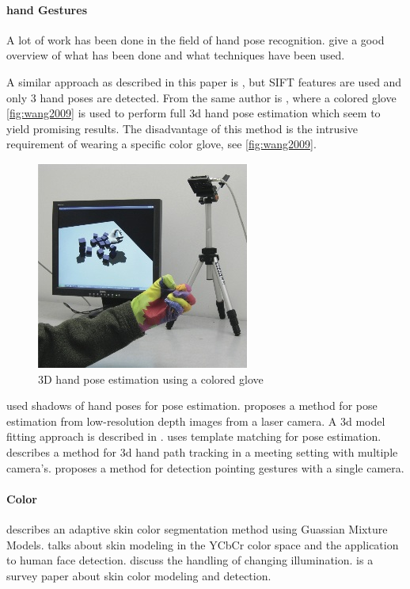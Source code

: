 \paragraph{hand Gestures}
A lot of work has been done in the field of hand pose recognition. \cite{Erol2007,Mitra2007} give a good overview of what has been done and what techniques have been used.

A similar approach as described in this paper is \cite{Wang2007}, but SIFT features are used and only 3 hand poses are detected. From the same author is \cite{Wang2009}, where a colored glove \autoref{fig:wang2009} is used to perform full 3d hand pose estimation which seem to yield promising results. The disadvantage of this method is the intrusive requirement of wearing a specific color glove, see \autoref{fig:wang2009}.

\begin{figure}[htbp]
	\center{}
	\includegraphics[width=0.4\linewidth]{figures/wang2009.jpg}
	\caption{3D hand pose estimation using a colored glove}
	\label{fig:wang2009}
\end{figure}

\cite{Segen1999} used shadows of hand poses for pose estimation. \cite{Mo2006} proposes a method for pose estimation from low-resolution depth images from a laser camera. A 3d model fitting approach is described in \cite{Athitsos2003,laGorce2010}. \cite{Stenger2006} uses template matching for pose estimation. \cite{Xiong2006} describes a method for 3d hand path tracking in a meeting setting with multiple camera's. \cite{Nickel2007} proposes a method for detection pointing gestures with a single camera.


\paragraph{Color}
 \cite{Hassanpour2008} describes an adaptive skin color segmentation method using Guassian Mixture Models. \cite{Phung2002} talks about skin modeling in the YCbCr color space and the application to human face detection. \cite{Sigal2004,Soriano2000,Stoerring1999} discuss the handling of changing illumination. \cite{Kakumanu2007} is a survey paper about skin color modeling and detection.


